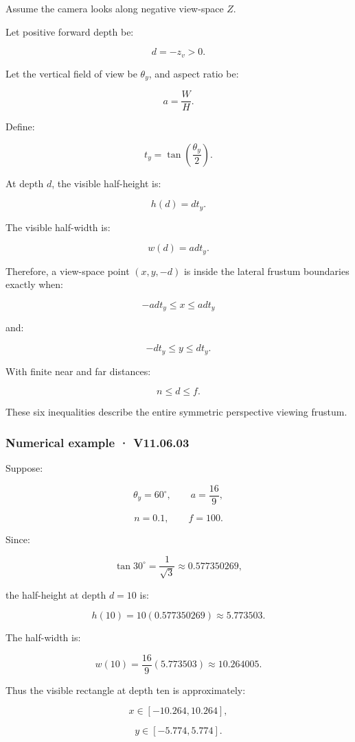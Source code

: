 Assume the camera looks along negative view-space \(Z\).

Let positive forward depth be:

\[
 d=-z_v>0.
\]

Let the vertical field of view be \(\theta_y\), and aspect ratio be:

\[
 a=\frac WH.
\]

Define:

\[
 t_y=\tan\left(\frac{\theta_y}{2}\right).
\]

At depth \(d\), the visible half-height is:

\[
 \boxed{h(d)=dt_y}.
\]

The visible half-width is:

\[
 \boxed{w(d)=ad t_y}.
\]

Therefore, a view-space point \((x,y,-d)\) is inside the lateral frustum boundaries exactly when:

\[
 \boxed{-ad t_y\le x\le ad t_y}
\]

and:

\[
 \boxed{-dt_y\le y\le dt_y}.
\]

With finite near and far distances:

\[
 \boxed{n\le d\le f}.
\]

These six inequalities describe the entire symmetric perspective viewing frustum.

\subsubsection{Numerical example · V11.06.03}\label{numerical-example-v11.06.03}

Suppose:

\[
 \theta_y=60^\circ,\qquad a=\frac{16}{9},
\]

\[
 n=0.1,\qquad f=100.
\]

Since:

\[
 \tan30^\circ=\frac1{\sqrt3}\approx0.577350269,
\]

the half-height at depth \(d=10\) is:

\[
 h(10)=10(0.577350269)\approx5.773503.
\]

The half-width is:

\[
 w(10)=\frac{16}{9}(5.773503)\approx10.264005.
\]

Thus the visible rectangle at depth ten is approximately:

\[
 x\in[-10.264,10.264],
\]

\[
 y\in[-5.774,5.774].
\]

